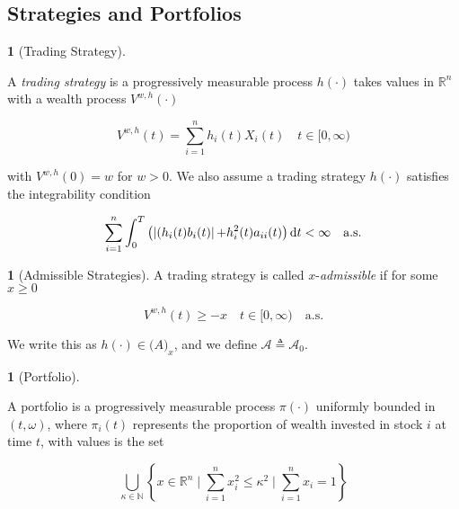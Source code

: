 \documentclass[british]{amsart}
\numberwithin{equation}{section}
\numberwithin{figure}{section}
\theoremstyle{plain}
\theoremstyle{definition}
\newtheorem{defn}[thm]{\protect\definitionname}
\theoremstyle{plain}
\theoremstyle{plain}
\theoremstyle{plain}
\theoremstyle{remark}
\theoremstyle{plain}
\providecommand{\definitionname}{Definition}
\renewcommand{\d}[1]{\mathop{\mathrm{d}{#1}}}
\newcommand{\ranget}{t\in[0,\infty)}
\newcommand{\defeq}{\mathop{\triangleq}}
\newcommand{\almostsurely}{\text{a.s.}}
\begin{document}
\subsection{Strategies and Portfolios}

\begin{defn} [Trading Strategy]
	\label{def:tradingstrategy}

	A \textit{trading strategy} is a progressively measurable process $h(\cdot)$ 
	takes values in $\mathbb{R}^{n}$ with a wealth process $V^{w,h}(\cdot)$ 

 	\begin{equation*}
		V^{w,h}(t) = \sum_{i=1}^{n} h_{i}(t) X_{i}(t) 
		\quad \ranget
	\end{equation*}

	with $V^{w,h}(0)=w$ for $w > 0$. We also assume a trading strategy $h(\cdot)$  
	satisfies the integrability condition

 	\begin{equation*}
		\sum_{i=1}^{n} \int_{0}^{T} 
		\left(
		\abs{(h_{i}(t)b_{i}(t)} + h_{i}^2(t)a_{ii}(t)
			\right) \d{t} < \infty
		\quad	\almostsurely
	\end{equation*}

\end{defn}

\begin{defn} [Admissible Strategies]

	A trading strategy is called $x$-\textit{admissible} if for some $x \ge 0$

 	\begin{equation*}
		V^{w,h}(t) \ge -x
		\quad \ranget
		\quad \almostsurely
	\end{equation*}

	We write this as $h(\cdot) \in \mathcal(A)_{x}$, and we define 
	$\mathcal{A} \defeq \mathcal{A}_{0}$.

\end{defn}

\begin{defn} [Portfolio]
	\label{def:portfolio}

	A portfolio is a progressively measurable process $\pi(\cdot)$ uniformly bounded in 
	$(t,\omega)$,	where $\pi_{i}(t)$ represents the proportion of wealth invested in stock 
	$i$ at time $t$, with values is the set

	\begin{equation}
		\bigcup_{\kappa \in \mathbb{N}} 
		\left\{ 
			x \in \mathbb{R}^{n} \mid 
			\sum_{i=1}^{n} x_{i}^2 \le \kappa^2 \mid
			\sum_{i=1}^{n} x_{i} = 1
		\right\} 
 	\end{equation}
\end{defn}
\end{document}
